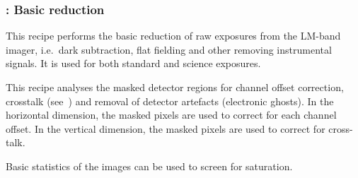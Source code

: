 \subsubsection{:  Basic reduction}
\label{lm_img_basic}
\label{rec:lm_img_basic}
\label{sssec:lm_img_basic}
\label{metis_lm_img_basic_reduce}
\label{rec:metis_lm_img_basic_reduce}
\label{sssec:metis_lm_img_basic_reduce}


This recipe performs the basic reduction of raw exposures from the
LM-band imager, i.e.\ dark subtraction, flat fielding and other removing
instrumental signals. It is used for both standard and science exposures.

This recipe analyses the masked detector regions for channel offset correction, crosstalk (see~\cite{matisse_minutes}) and removal of detector artefacts (electronic ghosts).
In the horizontal dimension, the masked pixels are used to correct for each channel offset.
In the vertical dimension, the masked pixels are used to correct for cross-talk.

Basic statistics of the images can be used to screen for saturation.

